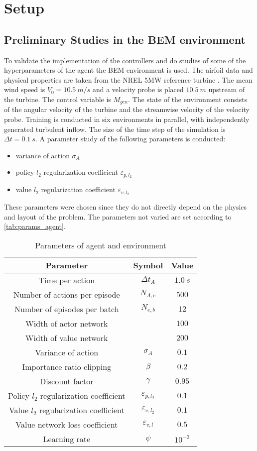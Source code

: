\section{Setup}
\subsection{Preliminary Studies in the BEM environment}
To validate the implementation of the controllers and do studies of some of the hyperparameters of the agent the BEM environment is used. The airfoil data and physical properties are taken from the NREL 5MW reference turbine \cite{jonkman_definition_2009}. The mean wind speed is $V_0=\SI{10.5}{m/s}$ and a velocity probe is placed $\SI{10.5}{m}$ upstream of the turbine.
The control variable is $M_{gen}$. The state of the environment consists of the angular velocity of the turbine and the streamwise velocity of the velocity probe. Training is conducted in six environments in parallel, with independently generated turbulent inflow. The size of the time step of the simulation is $\Delta t = \SI{0.1}{s}$.
A parameter study of the following parameters is conducted:
\begin{itemize}
	\item variance of action $\sigma_A$
	\item policy $l_2$ regularization coefficient $\varepsilon_{p,l_2}$
	\item value $l_2$ regularization coefficient $\varepsilon_{v,l_2}$
\end{itemize}
These parameters were chosen since they do not directly depend on the physics and layout of the problem. The parameters not varied are set according to \autoref{tab:params_agent}.
\begin{table}[h]
	\centering
	\caption{Parameters of agent and environment}
	\begin{tabular}{ccc}
		\toprule
		Parameter & Symbol & Value \\
		\midrule
		Time per action & $\Delta t_A$ & $\SI{1.0}{s}$ \\ 
		Number of actions per episode & $N_{A,e}$ & $500$ \\
		Number of episodes per batch & $N_{e,b}$ & $12$ \\
		Width of actor network & & $100$ \\ 
		Width of value network & & $200$ \\ 
		Variance of action & $\sigma_A$ & $0.1$ \\ 
		Importance ratio clipping & $\beta$ & $0.2$ \\ 
		Discount factor & $\gamma$ & $0.95$ \\ 
		Policy $l_2$ regularization coefficient & $\varepsilon_{p,l_2} $ & $0.1$ \\ 
		Value $l_2$ regularization coefficient & $\varepsilon_{v,l_2}$ & $0.1$ \\ 
		Value network loss coefficient & $\varepsilon_{v,l}$ & $0.5$ \\ 
		Learning rate & $\psi$ & $10^{-3}$ \\
		\bottomrule
	\end{tabular}
	\label{tab:params_agent}
\end{table}

